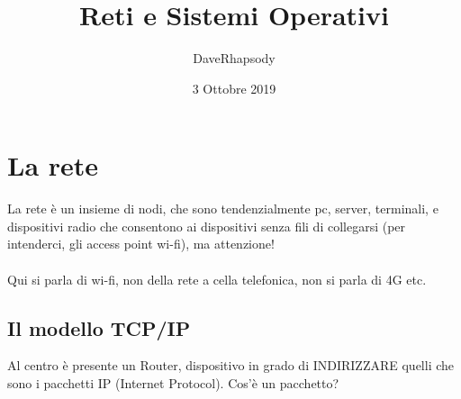 \documentclass[12pt, a4paper, openany, twoside]{book}
\begin{document}
\pagestyle{headings}
\author{DaveRhapsody}
\title{Reti e Sistemi Operativi}
\date{3 Ottobre 2019}
\maketitle
\tableofcontents
\chapter{La rete}
La rete è un insieme di nodi, che sono tendenzialmente pc, server, terminali,
e dispositivi radio che consentono ai dispositivi senza fili di collegarsi
(per intenderci, gli access point wi-fi), ma attenzione! \\ \\
Qui si parla di wi-fi, non della rete a cella telefonica, non si parla di 4G etc.
\section{Il modello TCP/IP}
Al centro è presente un Router, dispositivo in grado di INDIRIZZARE quelli che
sono i pacchetti IP (Internet Protocol). Cos'è un pacchetto?
\end{document}
